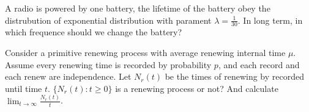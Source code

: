 \documentclass{ctexart}
\newif\ifpreface
\begin{document}
\large
\setlength{\baselineskip}{1.2em}
\ifpreface
  
\else
\fi
{}
\begin{problem}\label{pro:1}
  A radio is powered by one battery, the lifetime of the battery obey the distrubution of exponential distribution
  with parament \(\lambda = \frac{1}{30}\). In long term, in which frequence should we change the battery?
\end{problem}

\begin{problem}\label{pro:2}
  Consider a primitive renewing process with average renewing internal time \(\mu\). Assume every renewing time
  is recorded by probability \(p\), and each record and each renew are independence. Let \(N_r(t)\) be the
  times of renewing by recorded until time \(t\). \(\{N_r(t): t \geq 0\}\) is a renewing process or not?
  And calculate \(\lim_{t \to \infty}\frac{N_r(t)}{t}\).
\end{problem}
\end{document}
